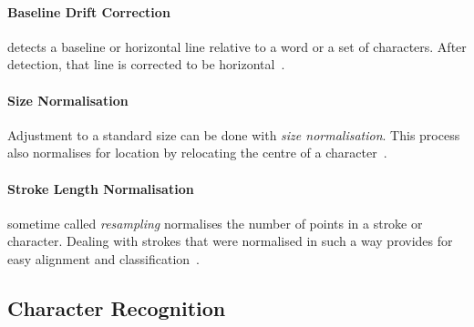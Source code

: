 \paragraph{Baseline Drift Correction} 
detects a baseline or horizontal line relative
to a word or a set of characters. After detection, that line is corrected to
be horizontal~.

\paragraph{Size Normalisation}
Adjustment to a standard size can be done with \emph{size normalisation}. This 
process also normalises for location by relocating the centre of a 
character~.

\paragraph{Stroke Length Normalisation}
sometime called \emph{resampling} normalises
the number of points in a stroke or character. Dealing with strokes that were 
normalised in such a way provides for easy alignment and 
classification~. 

\subsection{Character Recognition}
\label{sec:characterrecognition}


